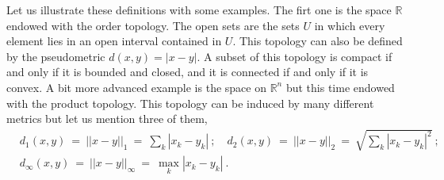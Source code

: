 \documentclass[10pt]{book}
\newcommand{\abs}[1]{\left|#1\right|}
\newcommand{\norm}[1]{\left|\left|#1\right|\right|}
\newcommand{\Rbb}{\mathbb{R}}
\newcommand{\Xsf}{\mathsf{X}}
\theoremstyle{break}
\newtheorem{lemma}{Lemma}
\newtheorem{proof}{Proof}
\begin{document}
Let us illustrate these definitions with some examples. The firt one is the space $\Rbb$ endowed with the order topology. The open sets are the sets $U$ in which every element lies in an open interval contained in $U$. This topology can also be defined by the pseudometric $d(x,y) = \abs{x-y}$. A subset of this topology is compact if and only if it is bounded and closed, and it is connected if and only if it is convex. %
A bit more advanced example is the space on $\Rbb^n$ but this time endowed with the product topology. This topology can be induced by many different metrics but let us mention three of them,
%
\begin{eqnarray*}
&d_1(x,y) \ = \ \norm{x-y}_1 \ = \ \sum_k \abs{x_k - y_k} \ ; \quad 
d_2(x,y) \ = \ \norm{x-y}_2 \ = \ \sqrt{ \sum_k \abs{x_k - y_k}^2 } \ ;& \\
&d_\infty(x,y) \ = \ \norm{x-y}_\infty \ = \ \max_k \abs{x_k - y_k} \ .&
\end{eqnarray*}




\bigskip






%
%
%
%
%
%
%
%
%
%
\end{document}
